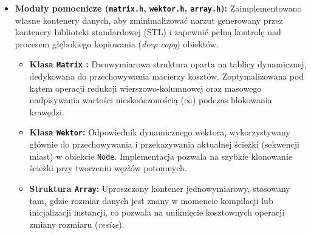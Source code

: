 \documentclass[12pt, a4paper]{article}
\begin{document}
\begin{itemize}
\item \textbf{Moduły pomocnicze (\texttt{matrix.h}, \texttt{wektor.h}, \texttt{array.h}):}
Zaimplementowano własne kontenery danych, aby zminimalizować narzut generowany przez kontenery biblioteki standardowej (STL) i zapewnić pełną kontrolę nad procesem głębokiego kopiowania (\textit{deep copy}) obiektów.
	\begin{itemize}
		\item \textbf{Klasa \texttt{Matrix} :} Dwuwymiarowa struktura oparta na tablicy dynamicznej, dedykowana do przechowywania macierzy kosztów. Zoptymalizowana pod kątem operacji redukcji wierszowo-kolumnowej oraz masowego nadpisywania wartości nieskończonością ($\infty$) podczas blokowania krawędzi.
		
		\item \textbf{Klasa \texttt{Wektor}:} Odpowiednik dynamicznego wektora, wykorzystywany głównie do przechowywania i przekazywania aktualnej ścieżki (sekwencji miast) w obiekcie \texttt{Node}. Implementacja pozwala na szybkie klonowanie ścieżki przy tworzeniu węzłów potomnych.
		\item \textbf{Struktura \texttt{Array}:} Uproszczony kontener jednowymiarowy, stosowany tam, gdzie rozmiar danych jest znany w momencie kompilacji lub inicjalizacji instancji, co pozwala na uniknięcie kosztownych operacji zmiany rozmiaru (\textit{resize}).
	\end{itemize}
\end{itemize}
	
\end{document}
